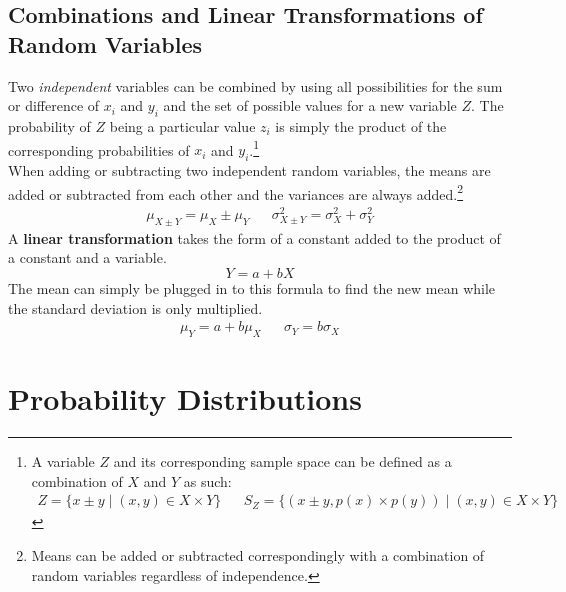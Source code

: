 \documentclass[../AP_Statistics.tex]{subfiles}
\begin{document}
		\section{Combinations and Linear Transformations of Random Variables}
			Two \emph{independent} variables can be combined by using all possibilities for the sum or difference of $x_i$ and $y_i$ and the set of possible values for a new variable $Z$. The probability of $Z$ being a particular value $z_i$ is simply the product of the corresponding probabilities of $x_i$ and $y_i$.\footnote{A variable $Z$ and its corresponding sample space can be defined as a combination of $X$ and $Y$ as such:\begin{align*}Z = \{x\pm y\mid(x, y) \in X \times Y\} && S_Z = \{(x \pm y, p(x) \times p(y)) \mid (x, y) \in X \times Y\}\end{align*}} \\
			When adding or subtracting two independent random variables, the means are added or subtracted from each other and the variances are always added.\footnote{Means can be added or subtracted correspondingly with a combination of random variables regardless of independence.} \\
			\begin{align*}
				\mu_{X \pm Y} = \mu_X \pm \mu_Y && \sigma_{X \pm Y}^2 = \sigma_X^2 + \sigma_Y^2
			\end{align*}
			A \textbf{linear transformation} takes the form of a constant added to the product of a constant and a variable.
			$$Y = a + bX$$
			The mean can simply be plugged in to this formula to find the new mean while the standard deviation is only multiplied.
			\begin{align*}
				\mu_Y = a + b\mu_X && \sigma_Y = b\sigma_X
			\end{align*}
	\chapter{Probability Distributions}
\end{document}
